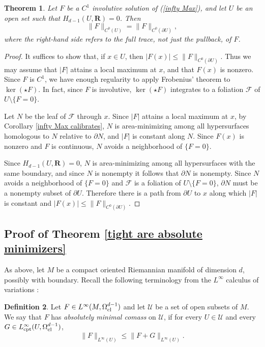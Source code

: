 \documentclass[reqno,11pt]{amsart}
\newcommand{\RR}{\mathbf{R}}
\newcommand{\dfn}[1]{\emph{#1}\index{#1}}
\newcommand{\cpt}{\mathrm{cpt}}
\newtheorem{theorem}{Theorem}[section]
\theoremstyle{definition}
\newtheorem{definition}[theorem]{Definition}
\numberwithin{equation}{section}
\begin{document}
\begin{theorem}\label{ABC inequality}
Let $F$ be a $C^1$ involutive solution of (\ref{infty Max}), and let $U$ be an open set such that $H_{d - 1}(U, \RR) = 0$.
Then 
$$\|F\|_{C^0(U)} = \|F\|_{C^0(\partial U)},$$
where the right-hand side refers to the full trace, not just the pullback, of $F$.
\end{theorem}
\begin{proof}
It suffices to show that, if $x \in U$, then $|F(x)| \leq \|F\|_{C^0(\partial U)}$.
Thus we may assume that $|F|$ attains a local maximum at $x$, and that $F(x)$ is nonzero.
Since $F$ is $C^1$, we have enough regularity to apply Frobenius' theorem to $\ker(\star F)$.
In fact, since $F$ is involutive, $\ker(\star F)$ integrates to a foliation $\mathscr F$ of $U \setminus \{F = 0\}$.

Let $N$ be the leaf of $\mathscr F$ through $x$.
Since $|F|$ attains a local maximum at $x$, by Corollary \ref{infty Max calibrates}, $N$ is area-minimizing among all hypersurfaces homologous to $N$ relative to $\partial N$, and $|F|$ is constant along $N$.
Since $F(x)$ is nonzero and $F$ is continuous, $N$ avoids a neighborhood of $\{F = 0\}$.

Since $H_{d - 1}(U, \RR) = 0$, $N$ is area-minimizing among all hypersurfaces with the same boundary, and since $N$ is nonempty it follows that $\partial N$ is nonempty.
Since $N$ avoids a neighborhood of $\{F = 0\}$ and $\mathscr F$ is a foliation of $U \setminus \{F = 0\}$, $\partial N$ must be a nonempty subset of $\partial U$.
Therefore there is a path from $\partial U$ to $x$ along which $|F|$ is constant and $|F(x)| \leq \|F\|_{C^0(\partial U)}$.
\end{proof}

\subsection{Proof of Theorem \ref{tight are absolute minimizers}}
As above, let $M$ be a compact oriented Riemannian manifold of dimension $d$, possibly with boundary.
Recall the following terminology from the $L^\infty$ calculus of variations \cite[Introduction]{Crandall2008}:

\begin{definition}
Let $F \in L^\infty(M, \Omega^{d - 1}_{\rm cl})$ and let $\mathscr U$ be a set of open subsets of $M$.
We say that $F$ has \dfn{absolutely minimal comass} on $\mathscr U$, if for every $U \in \mathscr U$ and every $G \in L^\infty_\cpt(U, \Omega^{d - 1}_{\rm cl})$,
$$\|F\|_{L^\infty(U)} \leq \|F + G\|_{L^\infty(U)}.$$
\end{definition}
\end{document}
